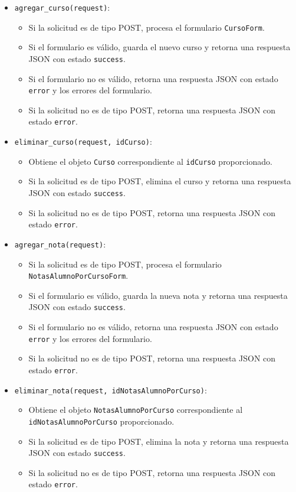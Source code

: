 \documentclass{article}
\begin{document}
\begin{itemize}
    \item \texttt{agregar\_curso(request)}:
    \begin{itemize}
        \item Si la solicitud es de tipo POST, procesa el formulario \texttt{CursoForm}.
        \item Si el formulario es válido, guarda el nuevo curso y retorna una respuesta JSON con estado \texttt{success}.
        \item Si el formulario no es válido, retorna una respuesta JSON con estado \texttt{error} y los errores del formulario.
        \item Si la solicitud no es de tipo POST, retorna una respuesta JSON con estado \texttt{error}.
    \end{itemize}

    \item \texttt{eliminar\_curso(request, idCurso)}:
    \begin{itemize}
        \item Obtiene el objeto \texttt{Curso} correspondiente al \texttt{idCurso} proporcionado.
        \item Si la solicitud es de tipo POST, elimina el curso y retorna una respuesta JSON con estado \texttt{success}.
        \item Si la solicitud no es de tipo POST, retorna una respuesta JSON con estado \texttt{error}.
    \end{itemize}

    \item \texttt{agregar\_nota(request)}:
    \begin{itemize}
        \item Si la solicitud es de tipo POST, procesa el formulario \texttt{NotasAlumnoPorCursoForm}.
        \item Si el formulario es válido, guarda la nueva nota y retorna una respuesta JSON con estado \texttt{success}.
        \item Si el formulario no es válido, retorna una respuesta JSON con estado \texttt{error} y los errores del formulario.
        \item Si la solicitud no es de tipo POST, retorna una respuesta JSON con estado \texttt{error}.
    \end{itemize}

    \item \texttt{eliminar\_nota(request, idNotasAlumnoPorCurso)}:
    \begin{itemize}
        \item Obtiene el objeto \texttt{NotasAlumnoPorCurso} correspondiente al \texttt{idNotasAlumnoPorCurso} proporcionado.
        \item Si la solicitud es de tipo POST, elimina la nota y retorna una respuesta JSON con estado \texttt{success}.
        \item Si la solicitud no es de tipo POST, retorna una respuesta JSON con estado \texttt{error}.
    \end{itemize}
\end{itemize}
\end{document}
